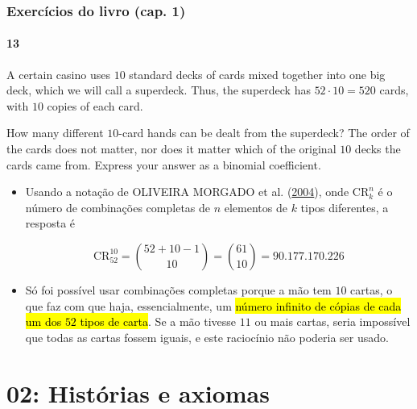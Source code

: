 \documentclass[
  11pt]{report}
\begin{document}
\hypertarget{exercuxedcios-do-livro-cap.-1}{%
\subsection*{Exercícios do livro (cap. 1)}\label{exercuxedcios-do-livro-cap.-1}}

\hypertarget{section}{%
\subsubsection*{13}\label{section}}

\begin{rmdbox}
A certain casino uses $10$ standard decks of cards mixed together into one big deck, which we will call a superdeck. Thus, the superdeck has $52 \cdot 10 = 520$ cards, with $10$ copies of each card.

How many different $10$-card hands can be dealt from the superdeck? The order of the cards does not matter, nor does it matter which of the original $10$ decks the cards came from. Express your answer as a binomial coefficient.

\end{rmdbox}

\begin{itemize}
\item
  Usando a notação de OLIVEIRA MORGADO et al. (\protect\hyperlink{ref-oliveira-2004-analis}{2004}), onde $\text{CR}_k^n$ é o número de combinações completas de $n$ elementos de $k$ tipos diferentes, a resposta é

  \[
  \text{CR}_{52}^{10} = \binom{52 + 10 - 1}{10} = \binom{61}{10} =
  90.177.170.226
  \]
\item
  Só foi possível usar combinações completas porque a mão tem $10$ cartas, o que faz com que haja, essencialmente, um {\hl{número infinito de cópias de cada um dos $52$ tipos de carta}}. Se a mão tivesse $11$ ou mais cartas, seria impossível que todas as cartas fossem iguais, e este raciocínio não poderia ser usado.
\end{itemize}

\hypertarget{histuxf3rias-e-axiomas}{%
\chapter*{02: Histórias e axiomas}\label{histuxf3rias-e-axiomas}}
\end{document}
